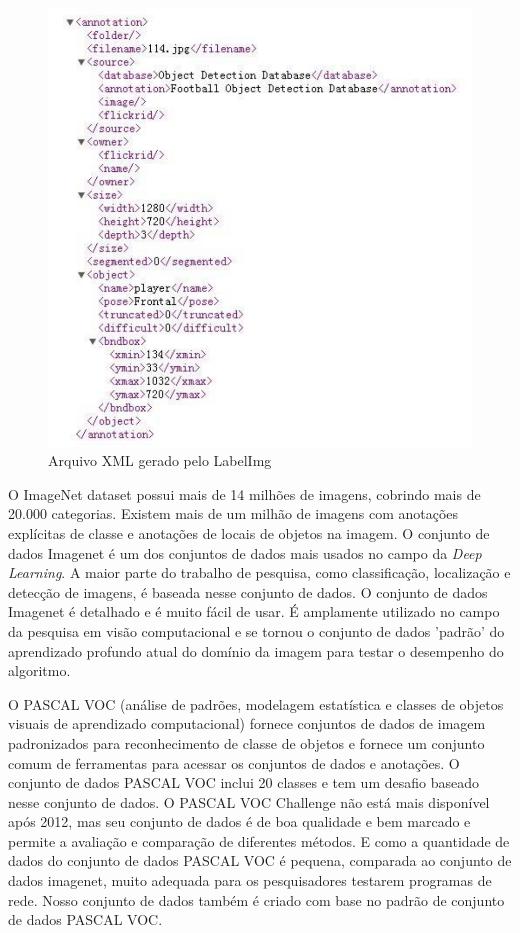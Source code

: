 \begin{figure}[htbp]
	\centering
	\includegraphics[width=0.8\linewidth]{figuras/MachineLearning/labelXml.png}
	\caption{Arquivo XML gerado pelo LabelImg}
	\label{fig:labelXml}
\end{figure}

O ImageNet dataset \cite{deng2009imagenet} possui mais de 14 milhões de imagens, cobrindo mais de 20.000 categorias. Existem mais de um milhão de imagens com anotações explícitas de classe e anotações de locais de objetos na imagem. O conjunto de dados Imagenet é um dos conjuntos de dados mais usados no campo da \textit{Deep Learning}. A maior parte do trabalho de pesquisa, como classificação, localização e detecção de imagens, é baseada nesse conjunto de dados. O conjunto de dados Imagenet é detalhado e é muito fácil de usar. É amplamente utilizado no campo da pesquisa em visão computacional e se tornou o conjunto de dados 'padrão' do aprendizado profundo atual do domínio da imagem para testar o desempenho do algoritmo. \cite{zhou2017application}

O PASCAL VOC (análise de padrões, modelagem estatística e classes de objetos visuais de aprendizado computacional) \cite{everingham2010pascal} fornece conjuntos de dados de imagem padronizados para reconhecimento de classe de objetos e fornece um conjunto comum de ferramentas para acessar os conjuntos de dados e anotações. O conjunto de dados PASCAL VOC inclui 20 classes e tem um desafio baseado nesse conjunto de dados. O PASCAL VOC Challenge \cite{everingham2010pascal} não está mais disponível após 2012, mas seu conjunto de dados é de boa qualidade e bem marcado e permite a avaliação e comparação de diferentes métodos. E como a quantidade de dados do conjunto de dados PASCAL VOC é pequena, comparada ao conjunto de dados imagenet, muito adequada para os pesquisadores testarem programas de rede. Nosso conjunto de dados também é criado com base no padrão de conjunto de dados PASCAL VOC.\cite{zhou2017application}


